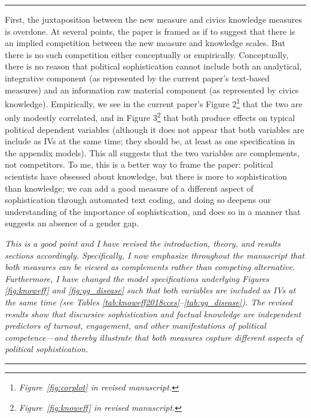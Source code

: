 
\rule{\linewidth}{.01cm}

First, the juxtaposition between the new measure and civics knowledge measures is overdone. At several points, the paper is framed as if to suggest that there is an implied competition between the new measure and knowledge scales. But there is no such competition either conceptually or empirically. Conceptually, there is no reason that political sophistication cannot include both an analytical, integrative component (as represented by the current paper's text-based measures) and an information raw material component (as represented by civics knowledge). Empirically, we see in the current paper's Figure 2\footnote{\textit{Figure~\ref{fig:corplot} in revised manuscript.}} that the two are only modestly correlated, and in Figure 3\footnote{\textit{Figure~\ref{fig:knoweff} in revised manuscript.}} that both produce effects on typical political dependent variables (although it does not appear that both variables are include as IVs at the same time; they should be, at least as one specification in the appendix models). This all suggests that the two variables are complements, not competitors. To me, this is a better way to frame the paper: political scientists have obsessed about knowledge, but there is more to sophistication than knowledge; we can add a good measure of a different aspect of sophistication through automated text coding, and doing so deepens our understanding of the importance of sophistication, and does so in a manner that suggests an absence of a gender gap. 

\textit{This is a good point and I have revised the introduction, theory, and results sections accordingly. Specifically, I now emphasize throughout the manuscript that both measures can be viewed as complements rather than competing alternative. Furthermore, I have changed the model specifications underlying Figures \ref{fig:knoweff} and \ref{fig:yg_disease} such that both variables are included as IVs at the same time (see Tables \ref{tab:knoweff2018cces}--\ref{tab:yg_disease}). The revised results show that discursive sophistication and factual knowledge are independent predictors of turnout, engagement, and other manifestations of political competence---and thereby illustrate that both measures capture different aspects of political sophistication.}


\rule{\linewidth}{.01cm}

